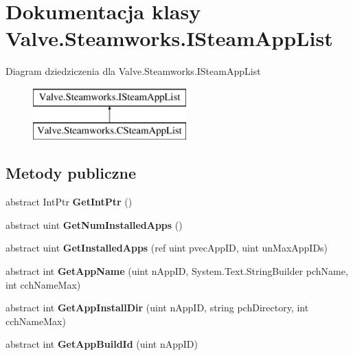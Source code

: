 \hypertarget{class_valve_1_1_steamworks_1_1_i_steam_app_list}{}\section{Dokumentacja klasy Valve.\+Steamworks.\+I\+Steam\+App\+List}
\label{class_valve_1_1_steamworks_1_1_i_steam_app_list}
Diagram dziedziczenia dla Valve.\+Steamworks.\+I\+Steam\+App\+List\begin{figure}[H]
\begin{center}
\leavevmode
\includegraphics[height=2.000000cm]{class_valve_1_1_steamworks_1_1_i_steam_app_list}
\end{center}
\end{figure}
\subsection*{Metody publiczne}
\begin{DoxyCompactItemize}
\item 
\mbox{\label{class_valve_1_1_steamworks_1_1_i_steam_app_list_ac4d5ce6bbbdf6b31a2d505c7a34d7c28}} 
abstract Int\+Ptr {\bfseries Get\+Int\+Ptr} ()
\item 
\mbox{\label{class_valve_1_1_steamworks_1_1_i_steam_app_list_a02c7b5c4fafd1b3be749526e27d478ce}} 
abstract uint {\bfseries Get\+Num\+Installed\+Apps} ()
\item 
\mbox{\label{class_valve_1_1_steamworks_1_1_i_steam_app_list_aa8fb1b68e8edcf4d80df0b99da1febd9}} 
abstract uint {\bfseries Get\+Installed\+Apps} (ref uint pvec\+App\+ID, uint un\+Max\+App\+I\+Ds)
\item 
\mbox{\label{class_valve_1_1_steamworks_1_1_i_steam_app_list_acb6c67594e68eb4f2490d65a964c6784}} 
abstract int {\bfseries Get\+App\+Name} (uint n\+App\+ID, System.\+Text.\+String\+Builder pch\+Name, int cch\+Name\+Max)
\item 
\mbox{\label{class_valve_1_1_steamworks_1_1_i_steam_app_list_aff2b3d65e02e13e9f3992f4257633905}} 
abstract int {\bfseries Get\+App\+Install\+Dir} (uint n\+App\+ID, string pch\+Directory, int cch\+Name\+Max)
\item 
\mbox{\label{class_valve_1_1_steamworks_1_1_i_steam_app_list_a8acdec6f26c073ce511052ea515a215a}} 
abstract int {\bfseries Get\+App\+Build\+Id} (uint n\+App\+ID)
\end{DoxyCompactItemize}


